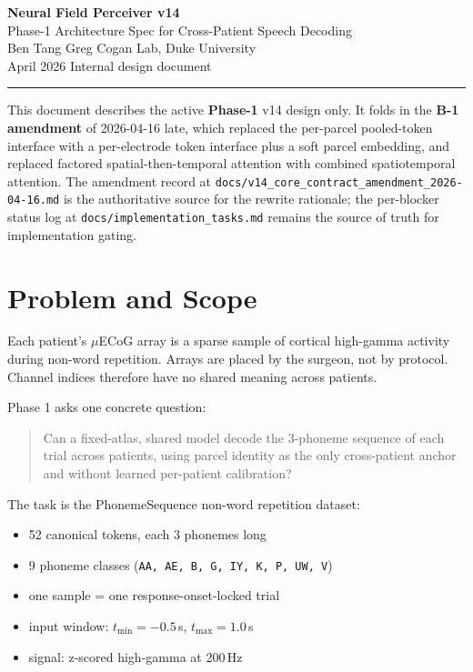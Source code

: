\documentclass[11pt,letterpaper]{article}
\begin{document}
\begin{center}
{\LARGE\bfseries Neural Field Perceiver v14}\\[6pt]
{\large Phase-1 Architecture Spec for Cross-Patient Speech Decoding}\\[10pt]
{\normalsize Ben Tang \quad\textbar\quad Greg Cogan Lab, Duke University}\\[4pt]
{\normalsize April 2026 \quad\textbar\quad Internal design document}
\end{center}

\medskip\noindent\rule{\textwidth}{0.4pt}\medskip

\noindent
This document describes the active \textbf{Phase-1} v14 design only. It folds in the \textbf{B-1 amendment} of 2026-04-16 late, which replaced the per-parcel pooled-token interface with a per-electrode token interface plus a soft parcel embedding, and replaced factored spatial-then-temporal attention with combined spatiotemporal attention. The amendment record at \texttt{docs/v14\_core\_contract\_amendment\_2026-04-16.md} is the authoritative source for the rewrite rationale; the per-blocker status log at \texttt{docs/implementation\_tasks.md} remains the source of truth for implementation gating.


\section{Problem and Scope}

Each patient's $\mu$ECoG array is a sparse sample of cortical high-gamma activity during non-word repetition. Arrays are placed by the surgeon, not by protocol. Channel indices therefore have no shared meaning across patients.

Phase 1 asks one concrete question:
\begin{quote}
Can a fixed-atlas, shared model decode the 3-phoneme sequence of each trial across patients, using parcel identity as the only cross-patient anchor and without learned per-patient calibration?
\end{quote}

The task is the PhonemeSequence non-word repetition dataset:
\begin{itemize}[leftmargin=2em, itemsep=0.2em]
\item 52 canonical tokens, each 3 phonemes long
\item 9 phoneme classes (\texttt{AA, AE, B, G, IY, K, P, UW, V})
\item one sample = one response-onset-locked trial
\item input window: $t_{\min}=-0.5$\,s, $t_{\max}=1.0$\,s
\item signal: z-scored high-gamma at 200\,Hz
\end{itemize}
\end{document}
